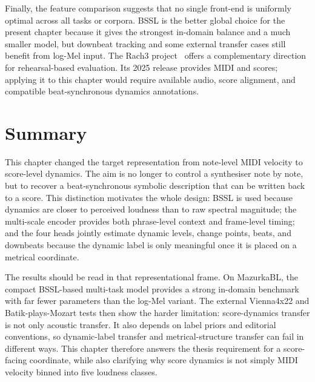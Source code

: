 Finally, the feature comparison suggests that no single front-end is uniformly optimal across all tasks or corpora. BSSL is the better global choice for the present chapter because it gives the strongest in-domain balance and a much smaller model, but downbeat tracking and some external transfer cases still benefit from log-Mel input. The Rach3 project~\cite{cancinochacon2024rach3,morsi2025enable_rach3} offers a complementary direction for rehearsal-based evaluation. Its 2025 release provides MIDI and scores; applying it to this chapter would require available audio, score alignment, and compatible beat-synchronous dynamics annotations.

\section{Summary}
\label{sec:audiodyn_summary}
This chapter changed the target representation from note-level MIDI velocity to score-level dynamics. The aim is no longer to control a synthesiser note by note, but to recover a beat-synchronous symbolic description that can be written back to a score. This distinction motivates the whole design: BSSL is used because dynamics are closer to perceived loudness than to raw spectral magnitude; the multi-scale encoder provides both phrase-level context and frame-level timing; and the four heads jointly estimate dynamic levels, change points, beats, and downbeats because the dynamic label is only meaningful once it is placed on a metrical coordinate.

The results should be read in that representational frame. On MazurkaBL, the compact BSSL-based multi-task model provides a strong in-domain benchmark with far fewer parameters than the log-Mel variant. The external Vienna4x22 and Batik-plays-Mozart tests then show the harder limitation: score-dynamics transfer is not only acoustic transfer. It also depends on label priors and editorial conventions, so dynamic-label transfer and metrical-structure transfer can fail in different ways. This chapter therefore answers the thesis requirement for a score-facing coordinate, while also clarifying why score dynamics is not simply MIDI velocity binned into five loudness classes.